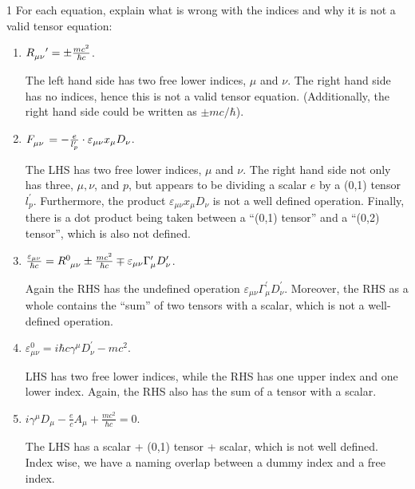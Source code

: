 \documentclass[11pt]{article}
\begin{document}
\begin{problem}{1}
	For each equation, explain what is wrong with the indices and why it is not a valid tensor equation:
	\begin{enumerate}[label=(\alph*)]
		\item \( \tensor{R}{ _{\mu\nu} }^{\prime} = \pm \frac{mc^2}{\hbar c}\).
		      \begin{answer}
			      The left hand side has two free lower indices, \(\mu\) and \(\nu\).
			      The right hand side has no indices, hence this is not a valid tensor equation.
			      (Additionally, the right hand side could be written as \( \pm mc/\hbar \)).
		      \end{answer}
		\item \( \tensor{F}{ _{\mu\nu} } = -\frac{e}{l^{\prime}_p} \cdot \varepsilon_{\mu\nu}x_{\mu}D_{\nu} \).
		      \begin{answer}
			      The LHS has two free lower indices, \(\mu\) and \(\nu\). The right hand side not only has three, \(\mu, \nu\), and \( p \), but appears to be dividing a scalar \( e \) by a (0,1) tensor \( l^{\prime}_p \).
			      Furthermore, the product \(\varepsilon_{\mu\nu}x_{\mu}D_{\nu}\) is not a well defined operation.
			      Finally, there is a dot product being taken between a ``(0,1) tensor'' and a ``(0,2) tensor'', which is also not defined.
		      \end{answer}
		\item \( \frac{\varepsilon_{\mu\nu}}{\hbar c} = \tensor{R}{ ^{0}_{\mu\nu} } \pm \frac{m c^2}{\hbar c} \mp \varepsilon_{\mu\nu} \Gamma^{\prime}_{\mu} D^{\prime}_{\nu} \).
		      \begin{answer}
			      Again the RHS has the undefined operation \( \varepsilon_{\mu\nu}\Gamma^{\prime}_{\mu}D^{\prime}_{\nu} \).
			      Moreover, the RHS as a whole contains the ``sum'' of two tensors with a scalar, which is not a well-defined operation.
		      \end{answer}
		\item \(\varepsilon^0_{\mu\nu} = i\hbar c \gamma^{\mu}D^{\prime}_{\nu} - mc^2\).
		      \begin{answer}
			      LHS has two free lower indices, while the RHS has one upper index and one lower index.
			      Again, the RHS also has the sum of a tensor with a scalar.
		      \end{answer}
		\item \(i\gamma^{\mu}D_{\mu} - \frac{e}{c}A_{\mu} + \frac{mc^2}{\hbar c} = 0\).
		      \begin{answer}
			      The LHS has a scalar + (0,1) tensor + scalar, which is not well defined.
			      Index wise, we have a naming overlap between a dummy index and a free index.
		      \end{answer}
	\end{enumerate}
\end{problem}
\end{document}
